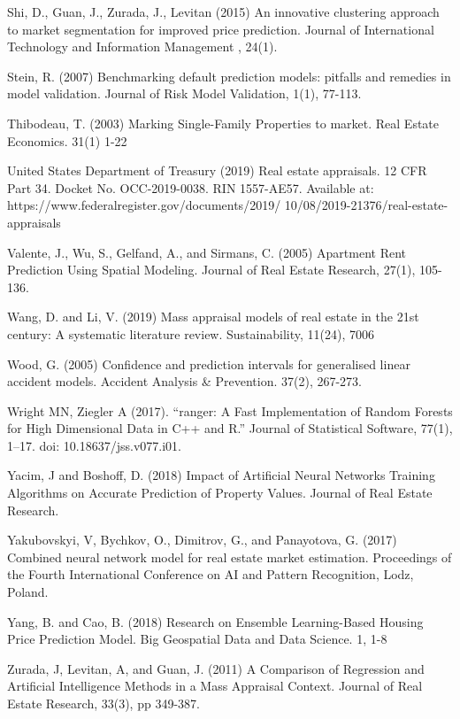 \documentclass[colTwo]{anon}
\theoremstyle{definition}
\begin{document}
\begin{thebibliography}{50}
\harvarditem{}{}{}Shi, D., Guan, J., Zurada, J., Levitan (2015) An innovative clustering approach to market segmentation for improved price prediction. Journal of International Technology and Information Management , 24(1).

\harvarditem{}{}{}Stein, R. (2007) Benchmarking default prediction models: pitfalls and remedies in model validation. Journal of Risk Model Validation, 1(1), 77-113.

\harvarditem{}{}{}Thibodeau, T. (2003) Marking Single-Family Properties to market. Real Estate Economics. 31(1) 1-22

\harvarditem{}{}{}United States Department of Treasury (2019) Real estate appraisals. 12 CFR Part 34. Docket No. OCC-2019-0038. RIN 1557-AE57. Available at: https://www.federalregister.gov/documents/2019/ 10/08/2019-21376/real-estate-appraisals

\harvarditem{}{}{}Valente, J., Wu, S., Gelfand, A., and Sirmans, C. (2005) Apartment Rent Prediction Using Spatial Modeling. Journal of Real Estate Research, 27(1), 105-136.

\harvarditem{}{}{}Wang, D. and Li, V. (2019) Mass appraisal models of real estate in the 21st century: A systematic literature review.  Sustainability, 11(24), 7006

\harvarditem{}{}{}Wood, G. (2005) Confidence and prediction intervals for generalised linear accident models. Accident Analysis \& Prevention. 37(2), 267-273.

\harvarditem{}{}{}Wright MN, Ziegler A (2017). “ranger: A Fast Implementation of Random Forests for High Dimensional Data in C++ and R.” Journal of Statistical Software, 77(1), 1–17. doi: 10.18637/jss.v077.i01.

\harvarditem{}{}{}Yacim, J and Boshoff, D. (2018) Impact of Artificial Neural Networks Training Algorithms on Accurate Prediction of Property Values. Journal of Real Estate Research.

\harvarditem{}{}{}Yakubovskyi, V, Bychkov, O., Dimitrov, G., and Panayotova, G.  (2017) Combined neural network model for real estate market estimation. Proceedings of the Fourth International Conference on AI and Pattern Recognition, Lodz, Poland.

\harvarditem{}{}{}Yang, B. and Cao, B. (2018) Research on Ensemble Learning-Based Housing Price Prediction Model. Big Geospatial Data and Data Science. 1, 1-8

\harvarditem{}{}{}Zurada, J, Levitan, A, and Guan, J. (2011) A Comparison of Regression and Artificial Intelligence Methods in a Mass Appraisal Context. Journal of Real Estate Research, 33(3), pp 349-387.

\end{thebibliography}
\end{document}
